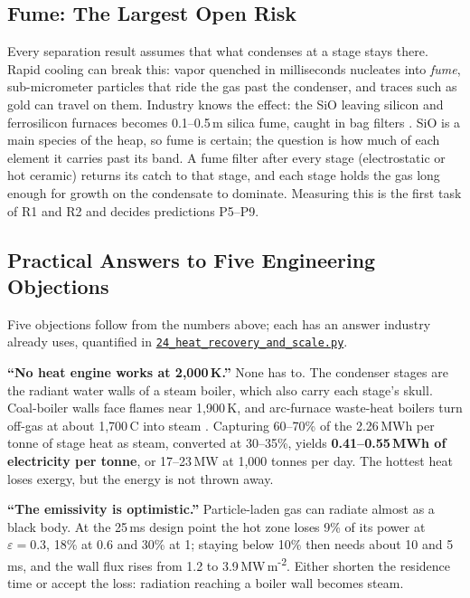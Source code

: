 \documentclass[11pt,a4paper]{article}
\newcommand{\gh}[2]{\href{https://github.com/syncaissa/paramanu-reclaimer/blob/main/#1}{\texttt{#2}}}
\theoremstyle{definition}
\theoremstyle{plain}
\theoremstyle{remark}
\begin{document}
\subsection{Fume: The Largest Open Risk}\label{sec:fume}
Every separation result assumes that what condenses at a stage stays there. Rapid cooling can break this: vapor quenched in milliseconds nucleates into \emph{fume}, sub-micrometer particles that ride the gas past the condenser, and traces such as gold can travel on them. Industry knows the effect: the SiO leaving silicon and ferrosilicon furnaces becomes 0.1--0.5\,\textmu m silica fume, caught in bag filters \citep{aci234r06}. SiO is a main species of the heap, so fume is certain; the question is how much of each element it carries past its band. A fume filter after every stage (electrostatic or hot ceramic) returns its catch to that stage, and each stage holds the gas long enough for growth on the condensate to dominate. Measuring this is the first task of R1 and R2 and decides predictions P5--P9.

\subsection{Practical Answers to Five Engineering Objections}\label{sec:practical}
Five objections follow from the numbers above; each has an answer industry already uses, quantified in \gh{simulation/scripts/24_heat_recovery_and_scale.py}{24\_heat\_recovery\_and\_scale.py}.

\textbf{``No heat engine works at 2,000\,K.''} None has to. The condenser stages are the radiant water walls of a steam boiler, which also carry each stage's skull. Coal-boiler walls face flames near 1,900\,K, and arc-furnace waste-heat boilers turn off-gas at about 1,700\,\textdegree C into steam \citep{gandt2016}. Capturing 60--70\% of the 2.26\,MWh per tonne of stage heat as steam, converted at 30--35\%, yields \textbf{0.41--0.55\,MWh of electricity per tonne}, or 17--23\,MW at 1,000 tonnes per day. The hottest heat loses exergy, but the energy is not thrown away.

\textbf{``The emissivity is optimistic.''} Particle-laden gas can radiate almost as a black body. At the 25\,ms design point the hot zone loses 9\% of its power at $\varepsilon = 0.3$, 18\% at 0.6 and 30\% at 1; staying below 10\% then needs about 10 and 5\,ms, and the wall flux rises from 1.2 to 3.9\,MW\,m\textsuperscript{-2}. Either shorten the residence time or accept the loss: radiation reaching a boiler wall becomes steam.
\end{document}
